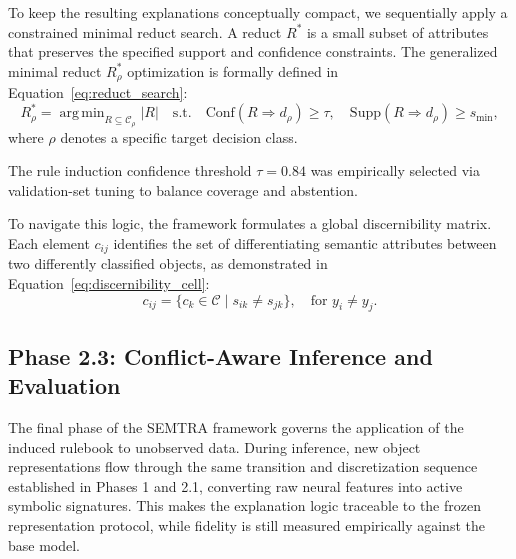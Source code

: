 \documentclass[make,article,submit,pdftex,moreauthors]{Definitions/mdpi}
\newcommand{\C}{\mathcal{C}}
\DeclareMathOperator*{\argmin}{arg\,min}
\begin{document}
To keep the resulting explanations conceptually compact, we sequentially apply a constrained minimal reduct search. A reduct $R^{\ast}$ is a small subset of attributes that preserves the specified support and confidence constraints. The generalized minimal reduct $R_{\rho}^{\ast}$ optimization is formally defined in Equation~\eqref{eq:reduct_search}:
\begin{equation}
 \label{eq:reduct_search}
 R_{\rho}^{\ast} = \argmin_{R \subseteq \C_{\rho}} |R| \quad \mathrm{s.t.}\quad \mathrm{Conf}(R \Rightarrow d_{\rho}) \geq \tau,\quad \mathrm{Supp}(R \Rightarrow d_{\rho}) \geq s_{\min},
\end{equation}
where $\rho$ denotes a specific target decision class.

The rule induction confidence threshold $\tau = 0.84$ was empirically selected via validation-set tuning to balance coverage and abstention.

To navigate this logic, the framework formulates a global discernibility matrix. Each element $c_{ij}$ identifies the set of differentiating semantic attributes between two differently classified objects, as demonstrated in Equation~\eqref{eq:discernibility_cell}:
\begin{equation}
 \label{eq:discernibility_cell}
 c_{ij} = \{c_k \in \C \mid s_{ik} \neq s_{jk}\}, \quad \text{for } y_i \neq y_j.
\end{equation}

\subsection{Phase 2.3: Conflict-Aware Inference and Evaluation}
\label{subsec:inference_fidelity_metrics}

The final phase of the SEMTRA framework governs the application of the induced rulebook to unobserved data. During inference, new object representations flow through the same transition and discretization sequence established in Phases 1 and 2.1, converting raw neural features into active symbolic signatures. This makes the explanation logic traceable to the frozen representation protocol, while fidelity is still measured empirically against the base model.

\end{document}
